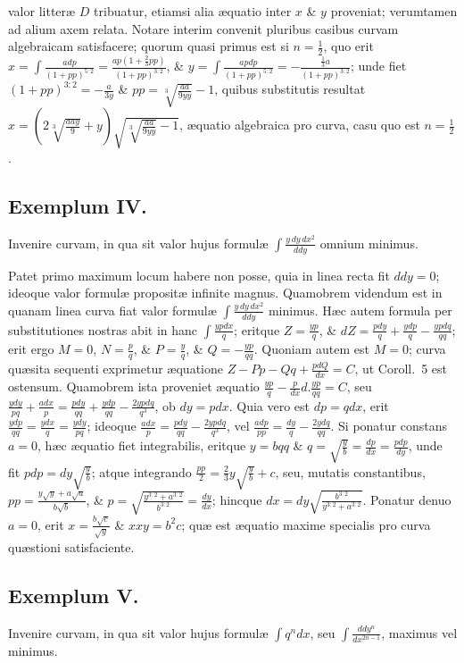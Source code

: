 valor litteræ $D$ tribuatur, etiamsi alia æquatio inter $x$ \& $y$ proveniat; verumtamen ad alium axem relata. Notare interim convenit pluribus casibus curvam algebraicam satisfacere; quorum quasi primus est si $n=\frac12$, quo erit $x=\int\frac{adp}{(1+pp)^{5:2}}=\frac{ap(1+\frac23pp)}{(1+pp)^{3:2}}$, \& $y=\int\frac{apdp}{(1+pp)^{5:2}}=-\frac{\frac13a}{(1+pp)^{3:2}}$; unde fiet $(1+pp)^{3:2}=-\frac a{3y}$ \& $pp=\sqrt[3]{\frac{aa}{9yy}}-1$, quibus substitutis resultat $x=(2\sqrt[3]{\frac{aay}{9}}+y)\sqrt{\sqrt[3]{\frac{aa}{9yy}}-1}$, æquatio algebraica pro curva, casu quo est $n=\frac12$.

\subsection*{Exemplum IV.}
Invenire curvam, in qua sit valor hujus formulæ $\int\frac{y\,dy\,dx^2}{ddy}$ omnium minimus.

Patet primo maximum locum habere non posse, quia in linea recta fit $ddy=0$; ideoque valor formulæ propositæ infinite magnus. Quamobrem videndum est in quanam linea curva fiat valor formulæ $\int\frac{y\,dy\,dx^2}{ddy}$ minimus. Hæc autem formula per substitutiones nostras abit in hanc $\int\frac{ypdx}{q}$; eritque $Z=\frac{yp}{q}$, \& $dZ=\frac{pdy}{q}+\frac{ydp}{q}-\frac{ypdq}{qq}$; erit ergo $M=0$, $N=\frac pq$, \& $P=\frac yq$, \& $Q=-\frac{yp}{qq}$. Quoniam autem est $M=0$; curva quæsita sequenti exprimetur æquatione $Z-Pp-Qq+\frac{pdQ}{dx}=C$, ut Coroll.~5 est ostensum. Quamobrem ista proveniet æquatio $\frac{yp}{q}-\frac p{dx}d.\frac{yp}{qq}=C$, seu $\frac{ydy}{pq}+\frac{adx}{p}=\frac{pdy}{qq}+\frac{ydp}{qq}-\frac{2ypdq}{q^3}$, ob $dy=pdx$. Quia vero est $dp=qdx$, erit $\frac{ydp}{qq}=\frac{ydx}{q}=\frac{ydy}{pq}$; ideoque $\frac{adx}{p}=\frac{pdy}{qq}-\frac{2ypdq}{q^3}$, vel $\frac{adp}{pp}=\frac{dy}{q}-\frac{2ydq}{qq}$. Si ponatur constans $a=0$, hæc æquatio fiet integrabilis, eritque $y=bqq$ \& $q=\sqrt{\frac yb}=\frac{dp}{dx}=\frac{pdp}{dy}$, unde fit $pdp=dy\sqrt{\frac yb}$; atque integrando $\frac{pp}{2}=\frac23y\sqrt{\frac yb}+c$, seu, mutatis constantibus, $pp=\frac{y\sqrt y+a\sqrt a}{b\sqrt b}$, \& $p=\sqrt{\frac{y^{3:2}+a^{3:2}}{b^{3:2}}}=\frac{dy}{dx}$; hincque $dx=dy\sqrt{\frac{b^{3:2}}{y^{3:2}+a^{3:2}}}$. Ponatur denuo $a=0$, erit $x=\frac{b\sqrt c}{\sqrt y}$ \& $xxy=b^2c$; quæ est æquatio maxime specialis pro curva quæstioni satisfaciente.

\subsection*{Exemplum V.}
Invenire curvam, in qua sit valor hujus formulæ $\int q^n dx$, seu $\int\frac{ddy^n}{dx^{2n-1}}$, maximus vel minimus.

